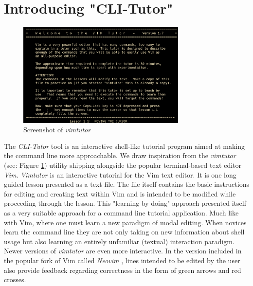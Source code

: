 \section{Introducing "CLI-Tutor"}
\begin{figure}[htbp]
	\centering
	\includegraphics[width=0.75\textwidth]{img/vimtutor}
	\caption{Screenshot of \textit{vimtutor}}
	\label{fig:vimtutor}
\end{figure}

The \textit{CLI-Tutor} tool is an interactive shell-like tutorial program aimed
at making the command line more approachable. We draw inspiration from the
\textit{vimtutor}\cite{pierce_ware_smith_moolenaar_2019} (see: Figure
\ref{fig:vimtutor}) utility shipping alongside the popular terminal-based text
editor \textit{Vim}. \textit{Vimtutor} is an interactive tutorial for the Vim
text editor. It is one long guided lesson presented as a text file. The file
itself contains the basic instructions for editing and creating text within Vim
and is intended to be modified while proceeding through the lesson. This
"learning by doing" approach presented itself as a very suitable approach for
a command line tutorial application. Much like with Vim, where one must learn a new
paradigm of modal editing. When novices learn the command line they are not only
taking on new information about shell usage but also learning an entirely
unfamiliar (textual) interaction paradigm. Newer versions of \textit{vimtutor}
are even more interactive. In the version included in the popular fork of Vim
called \textit{Neovim} \cite{neovimHomeNeovim}, lines intended to be edited by
the user also provide feedback regarding correctness in the form of green
arrows and red crosses.

